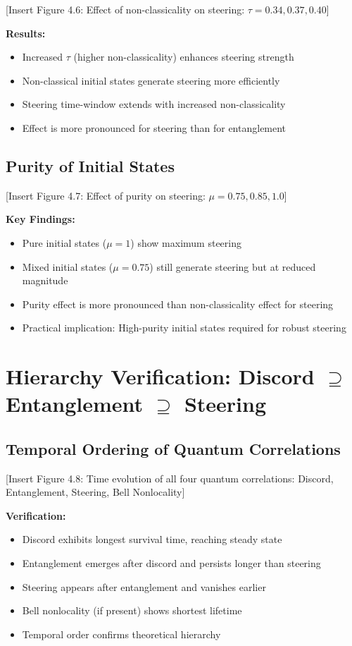 [Insert Figure 4.6: Effect of non-classicality on steering: $\tau = 0.34, 0.37, 0.40$]

\textbf{Results:}
\begin{itemize}
	\item Increased $\tau$ (higher non-classicality) enhances steering strength
	\item Non-classical initial states generate steering more efficiently
	\item Steering time-window extends with increased non-classicality
	\item Effect is more pronounced for steering than for entanglement
\end{itemize}

\subsection{Purity of Initial States}

[Insert Figure 4.7: Effect of purity on steering: $\mu = 0.75, 0.85, 1.0$]

\textbf{Key Findings:}
\begin{itemize}
	\item Pure initial states ($\mu = 1$) show maximum steering
	\item Mixed initial states ($\mu = 0.75$) still generate steering but at reduced magnitude
	\item Purity effect is more pronounced than non-classicality effect for steering
	\item Practical implication: High-purity initial states required for robust steering
\end{itemize}

\section{Hierarchy Verification: Discord $\supseteq$ Entanglement $\supseteq$ Steering}

\subsection{Temporal Ordering of Quantum Correlations}

[Insert Figure 4.8: Time evolution of all four quantum correlations: Discord, Entanglement, Steering, Bell Nonlocality]

\textbf{Verification:}
\begin{itemize}
	\item Discord exhibits longest survival time, reaching steady state
	\item Entanglement emerges after discord and persists longer than steering
	\item Steering appears after entanglement and vanishes earlier
	\item Bell nonlocality (if present) shows shortest lifetime
	\item Temporal order confirms theoretical hierarchy
\end{itemize}

